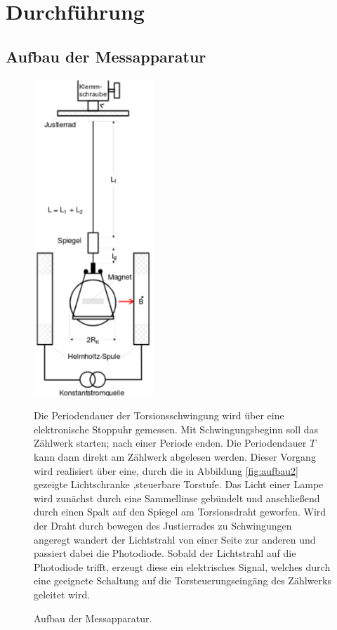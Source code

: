 \section{Durchführung}
\label{sec:Durchfuehrung}
\subsection{Aufbau der Messapparatur}
\begin{figure}
\begin{minipage}[l]{0.49\textwidth}
	\centering
	\includegraphics[width=0.4\textwidth]{Bilder/Aufbau1.pdf}
	\caption{Aufbau der Messapparatur. \cite{V102}}
	\label{fig:aufbau1}
\end{minipage}
\begin{minipage}[r]{0.49\textwidth}
	Die Periodendauer der Torsionsschwingung wird über eine elektronische Stoppuhr gemessen. 
	Mit Schwingungsbeginn soll das Zählwerk starten; nach einer Periode enden. Die Periodendauer $T$ kann dann direkt am Zählwerk abgelesen werden.
	Dieser Vorgang wird realisiert über eine, durch die in Abbildung \ref{fig:aufbau2} gezeigte Lichtschranke ,steuerbare Torstufe. 
	Das Licht einer Lampe wird zunächst durch eine Sammellinse gebündelt und anschließend durch einen Spalt auf den Spiegel am Torsionsdraht geworfen. Wird der Draht durch bewegen des Justierrades zu Schwingungen angeregt wandert der Lichtstrahl von einer Seite zur anderen und passiert dabei die Photodiode. 
	Sobald der Lichtstrahl auf die Photodiode trifft, erzeugt diese ein elektrisches Signal, welches durch eine geeignete Schaltung auf die Torsteuerungseingäng des Zählwerks geleitet wird.
\end{minipage}
\end{figure}

